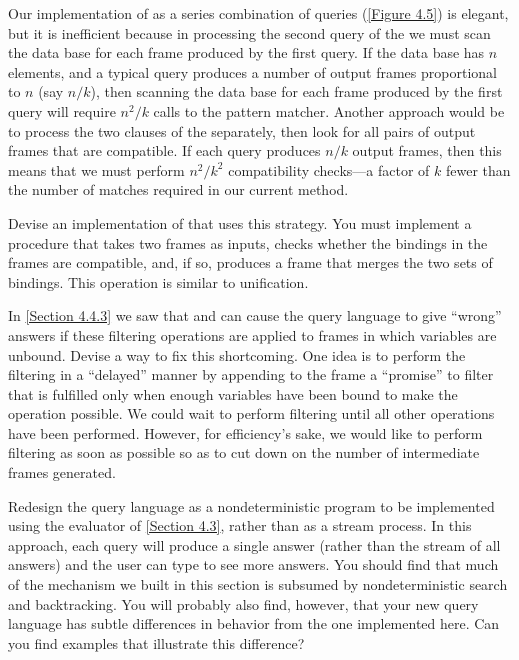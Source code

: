 \begin{exercise}
	\label{Exercise 4.76}
	Our implementation of  as a series combination of queries (\cref{Figure 4.5}) is elegant, but it is inefficient because in processing the second query of the  we must scan the data base for each frame produced by the first query.
	If the data base has \( n \) elements, and a typical query produces a number of output frames proportional to \( n \) (say \( n / k \)), then scanning the data base for each frame produced by the first query will require \( n^2 / k \) calls to the pattern matcher.
	Another approach would be to process the two clauses of the  separately, then look for all pairs of output frames that are compatible.
	If each query produces \( n / k \) output frames, then this means that we must perform \( n^2 / k^2 \) compatibility checks---a factor of \( k \) fewer than the number of matches required in our current method.

	Devise an implementation of  that uses this strategy.
	You must implement a procedure that takes two frames as inputs, checks whether the bindings in the frames are compatible, and, if so, produces a frame that merges the two sets of bindings.
	This operation is similar to unification.
\end{exercise}



\begin{exercise}
	\label{Exercise 4.77}
	In \cref{Section 4.4.3} we saw that  and  can cause the query language to give “wrong” answers if these filtering operations are applied to frames in which variables are unbound.
	Devise a way to fix this shortcoming.
	One idea is to perform the filtering in a “delayed” manner by appending to the frame a “promise” to filter that is fulfilled only when enough variables have been bound to make the operation possible.
	We could wait to perform filtering until all other operations have been performed.
	However, for efficiency’s sake, we would like to perform filtering as soon as possible so as to cut down on the number of intermediate frames generated.
\end{exercise}



\begin{exercise}
	\label{Exercise 4.78}
	Redesign the query language as a nondeterministic program to be implemented using the evaluator of \cref{Section 4.3}, rather than as a stream process.
	In this approach, each query will produce a single answer (rather than the stream of all answers) and the user can type  to see more answers.
	You should find that much of the mechanism we built in this section is subsumed by nondeterministic search and backtracking.
	You will probably also find, however, that your new query language has subtle differences in behavior from the one implemented here.
	Can you find examples that illustrate this difference?
\end{exercise}



